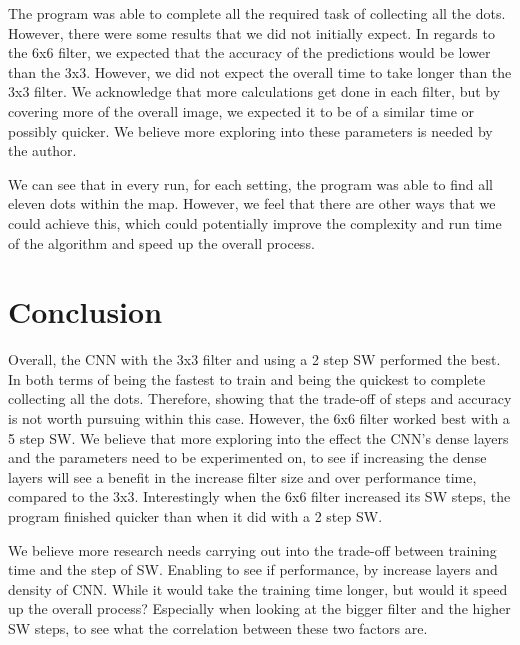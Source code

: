 \documentclass[a4paper,10pt]{article}
\begin{document}
The program was able to complete all the required task of collecting all the dots. However, there were some results that we did not initially expect. In regards to the 6x6 filter, we expected that the accuracy of the predictions would be lower than the 3x3. However, we did not expect the overall time to take longer than the 3x3 filter. We acknowledge that more calculations get done in each filter, but by covering more of the overall image, we expected it to be of a similar time or possibly quicker. We believe more exploring into these parameters is needed by the author.

We can see that in every run, for each setting, the program was able to find all eleven dots within the map. However, we feel that there are other ways that we could achieve this, which could potentially improve the complexity and run time of the algorithm and speed up the overall process. 

\section{Conclusion}

Overall, the CNN with the 3x3 filter and using a 2 step SW performed the best. In both terms of being the fastest to train and being the quickest to complete collecting all the dots. Therefore, showing that the trade-off of steps and accuracy is not worth pursuing within this case. However, the 6x6 filter worked best with a 5 step SW. We believe that more exploring into the effect the CNN's dense layers and the parameters need to be experimented on, to see if increasing the dense layers will see a benefit in the increase filter size and over performance time, compared to the 3x3. Interestingly when the 6x6 filter increased its SW steps, the program finished quicker than when it did with a 2 step SW. 

We believe more research needs carrying out into the trade-off between training time and the step of SW. Enabling to see if performance, by increase layers and density of CNN. While it would take the training time longer, but would it speed up the overall process? Especially when looking at the bigger filter and the higher SW steps, to see what the correlation between these two factors are.


%	
\end{document}
